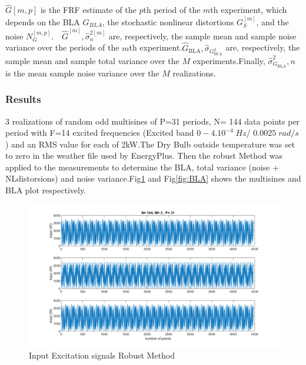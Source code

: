 \documentclass[a4paper,12pt]{report}
\numberwithin{equation}{section}
\begin{document}
\noindent

$\hat{G}[m, p]$ is the FRF estimate of the $p$th period of the $m$th experiment, which depends on the BLA $G_{BLA}$, the stochastic nonlinear distortions $G_{S}^{[m]}$, and the noise $N_{G}^{[m, p]}$.$ \quad \hat{G}^{[m]}, \hat{\sigma}_{n}^{2[m]}$ are, respectively, the sample mean and sample noise variance over the periods of the $m$th   experiment.$\hat{G}_{\mathrm{BLA}},\hat{\sigma}_{G_{\mathrm{Bl.A}}^{2}}$ are, respectively, the sample mean and sample total variance over the $M$ experiments.Finally, $\hat{\sigma}_{G_{\mathrm{BLA}}}^{2}, n$ is the mean sample noise variance over the $M$ realizations.

\subsubsection{Results}
3 realizations of random odd multisines of P=31 periods, N= 144 data points per period with F=14 excited frequencies (Excited band $0-4.10^{-4}\;Hz$/ $0.0025\;rad/s$) and an RMS value for each of 2kW.The Dry Bulb outside temperature was set to zero in the weather file used by EnergyPlus. Then the robust Method was applied to the measurements to determine the BLA, total variance (noise + NLdistorsions) and noise variance.Fig\ref{fig:multisine} and Fig\ref{fig:BLA} shows the multisines and BLA plot respectively.


\begin{figure}[H]
    \includegraphics[width=\textwidth]{multisine.png}
    \caption{Input Excitation signals Robust Method}
    \label{fig:multisine}
\end{figure}
\end{document}
